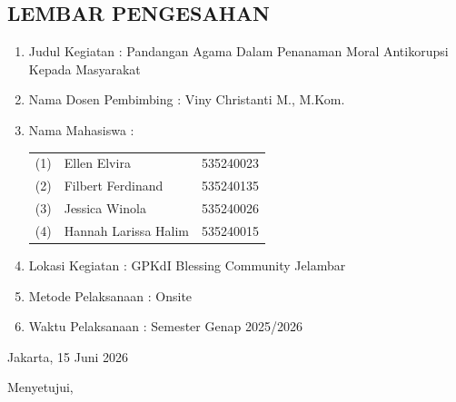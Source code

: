 \newpage
\begin{center}
    \section*{\textbf{LEMBAR PENGESAHAN}}
\end{center}

    \par\bigskip\bigskip

    \begin{enumerate}[label = \large\arabic*.]
        \large
        \item Judul Kegiatan \tabto{5cm} : Pandangan Agama Dalam \tabto{5.3cm}Penanaman Moral Antikorupsi \tabto{5.3cm}Kepada Masyarakat
        \item Nama Dosen Pembimbing \tabto{5cm} : Viny Christanti M., M.Kom.
        \item Nama Mahasiswa \tabto{5cm} : 
            \begin{tabular}[t]{@{}p{0.7cm}p{4.5cm}r@{}}
                (1) & Ellen Elvira         & 535240023 \\
                (2) & Filbert Ferdinand    & 535240135 \\
                (3) & Jessica Winola       & 535240026 \\
                (4) & Hannah Larissa Halim & 535240015 \\
        \end{tabular}
        \vspace{0.3cm}
        \item Lokasi Kegiatan \tabto{5cm} : GPKdI Blessing Community \tabto{5.3cm}Jelambar
        \item Metode Pelaksanaan \tabto{5cm} : Onsite
        \item Waktu Pelaksanaan \tabto{5cm} : Semester Genap 2025/2026
    \end{enumerate}


    \vspace{1cm}
    \large
    {\raggedleft Jakarta, 15 Juni 2026\par}

    \par\bigskip\bigskip
    {\centering Menyetujui,\par}
    \par\bigskip\bigskip

